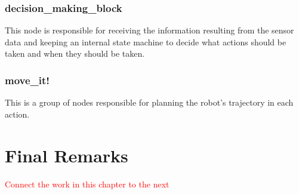 \subsubsection{decision\_making\_block}

This node is responsible for receiving the information resulting from the sensor data and keeping an internal state machine to decide what actions should be taken and when they should be taken.

\subsubsection{move\_it!}

This is a group of nodes responsible for planning the robot's trajectory in each action.
\fi

\section{Final Remarks}
\label{section:materials_methods_final_remarks}

\textcolor{red}{Connect the work in this chapter to the next}